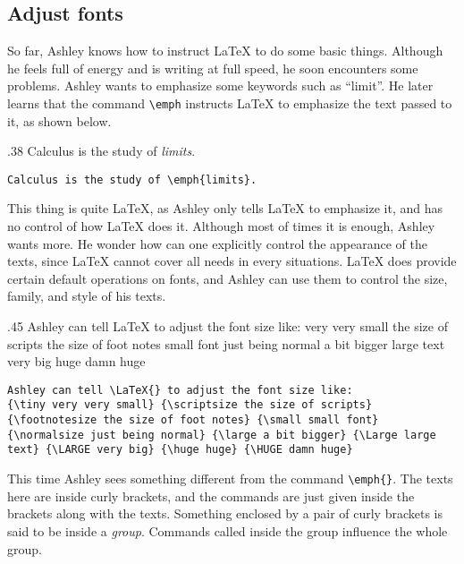 \subsection{Adjust fonts} \label{subsec:fonts}
So far, Ashley knows how to instruct \LaTeX{} to do some basic things. Although he feels full of energy and is writing at full speed, he soon encounters some problems. Ashley wants to emphasize some keywords such as ``limit''. He later learns that the command \verb=\emph= instructs \LaTeX{} to emphasize the text passed to it, as shown below.

\begin{parexammar}{.38\textandmarginlen}{
Calculus is the study of \emph{limits}.
}
\begin{lstlisting}
Calculus is the study of \emph{limits}.
\end{lstlisting}
\end{parexammar}

This thing is quite \LaTeX, as Ashley only tells \LaTeX{} to emphasize it, and has no control of how \LaTeX{} does it. Although most of times it is enough, Ashley wants more. He wonder how can one explicitly control the appearance of the texts, since \LaTeX{} cannot cover all needs in every situations. \LaTeX{} does provide certain default operations on fonts, and Ashley can use them to control the size, family, and style of his texts.

\begin{parexammar}{.45\textandmarginlen}{
Ashley can tell \LaTeX{} to adjust the font size like:
{\tiny very very small} {\scriptsize the size of scripts} {\footnotesize the size of foot notes} {\small small font} {\normalsize just being normal} {\large a bit bigger} {\Large large text} {\LARGE very big} {\huge huge} {\Huge damn huge}
}
\begin{lstlisting}
Ashley can tell \LaTeX{} to adjust the font size like:
{\tiny very very small} {\scriptsize the size of scripts} {\footnotesize the size of foot notes} {\small small font} {\normalsize just being normal} {\large a bit bigger} {\Large large text} {\LARGE very big} {\huge huge} {\HUGE damn huge}
\end{lstlisting}
\end{parexammar}
This time Ashley sees something different from the command \verb=\emph{}=. The texts here are inside curly brackets, and the commands are just given inside the brackets along with the texts. Something enclosed by a pair of curly brackets is said to be inside a \emph{group}. Commands called inside the group influence the whole group.

